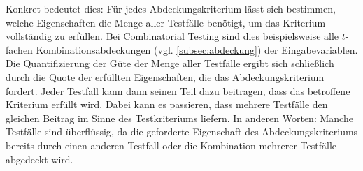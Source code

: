 Konkret bedeutet dies: Für jedes Abdeckungskriterium lässt sich bestimmen, welche Eigenschaften die Menge aller Testfälle benötigt, um das Kriterium vollständig zu erfüllen. Bei Combinatorial Testing sind dies beispielsweise alle $t$-fachen Kombinationsabdeckungen (vgl. \autoref{subsec:abdeckung}) der Eingabevariablen. Die Quantifizierung der Güte der Menge aller Testfälle ergibt sich schließlich durch die Quote der erfüllten Eigenschaften, die das Abdeckungskriterium fordert. Jeder Testfall kann dann seinen Teil dazu beitragen, dass das betroffene Kriterium erfüllt wird. Dabei kann es passieren, dass mehrere Testfälle den \glqq gleichen\grqq{} Beitrag im Sinne des Testkriteriums liefern. In anderen Worten: Manche Testfälle sind überflüssig, da die geforderte Eigenschaft des Abdeckungskriteriums bereits durch einen anderen Testfall oder die Kombination mehrerer Testfälle abgedeckt wird. 


